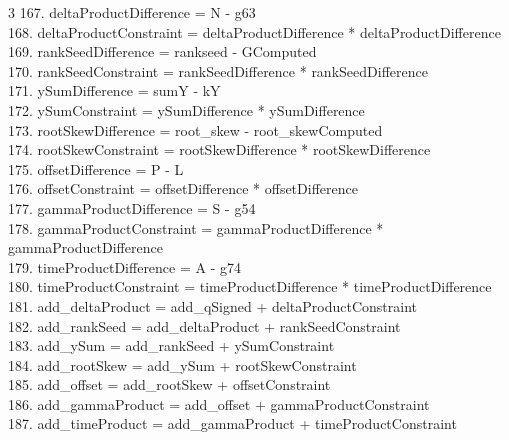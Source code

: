 \documentclass[10pt]{article}
\begin{document}
\begin{multicols}{3}
167. deltaProductDifference = N - g63\\
168. deltaProductConstraint = deltaProductDifference * deltaProductDifference\\
169. rankSeedDifference = rankseed - GComputed\\
170. rankSeedConstraint = rankSeedDifference * rankSeedDifference\\
171. ySumDifference = sumY - kY\\
172. ySumConstraint = ySumDifference * ySumDifference\\
173. rootSkewDifference = root\_skew - root\_skewComputed\\
174. rootSkewConstraint = rootSkewDifference * rootSkewDifference\\
175. offsetDifference = P - L\\
176. offsetConstraint = offsetDifference * offsetDifference\\
177. gammaProductDifference = S - g54\\
178. gammaProductConstraint = gammaProductDifference * gammaProductDifference\\
179. timeProductDifference = A - g74\\
180. timeProductConstraint = timeProductDifference * timeProductDifference\\
181. add\_deltaProduct = add\_qSigned + deltaProductConstraint\\
182. add\_rankSeed = add\_deltaProduct + rankSeedConstraint\\
183. add\_ySum = add\_rankSeed + ySumConstraint\\
184. add\_rootSkew = add\_ySum + rootSkewConstraint\\
185. add\_offset = add\_rootSkew + offsetConstraint\\
186. add\_gammaProduct = add\_offset + gammaProductConstraint\\
187. add\_timeProduct = add\_gammaProduct + timeProductConstraint\\
\end{multicols}
\end{document}
